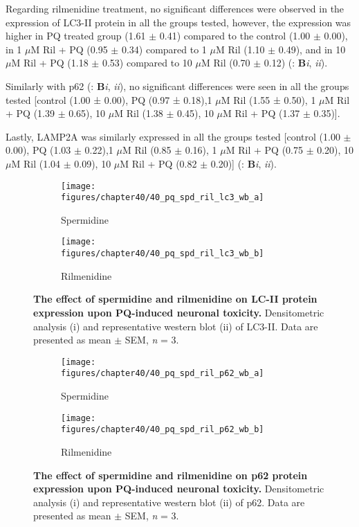 Regarding rilmenidine treatment, no significant differences were observed in the expression of LC3-II protein in all the groups tested, however, the expression was higher in PQ treated group (1.61 $\pm$ 0.41) compared to the control (1.00 $\pm$ 0.00), in 1 $\mu$M Ril + PQ (0.95 $\pm$ 0.34) compared to 1 $\mu$M Ril (1.10 $\pm$ 0.49), and in 10 $\mu$M Ril + PQ (1.18 $\pm$ 0.53) compared to 10 $\mu$M Ril (0.70 $\pm$ 0.12) (: \textbf{B}\textit{i}, \textit{ii}).

Similarly with p62 (: \textbf{B}\textit{i}, \textit{ii}), no significant differences were seen in all the groups tested [control (1.00 ± 0.00), PQ (0.97 ± 0.18),1 $\mu$M Ril (1.55 ± 0.50), 1 $\mu$M Ril + PQ (1.39 $\pm$ 0.65), 10 $\mu$M Ril (1.38 $\pm$ 0.45), 10 $\mu$M Ril + PQ (1.37 $\pm$ 0.35)].

Lastly, LAMP2A was similarly expressed in all the groups tested [control (1.00 $\pm$ 0.00), PQ (1.03 $\pm$ 0.22),1 $\mu$M Ril (0.85 $\pm$ 0.16), 1 $\mu$M Ril + PQ (0.75 $\pm$ 0.20), 10 $\mu$M Ril (1.04 $\pm$ 0.09), 10 $\mu$M Ril + PQ (0.82 $\pm$ 0.20)] (: \textbf{B}\textit{i}, \textit{ii}).

\begin{figure}[!htbp]
  \center
  \begin{subfigure}[b]{0.495\linewidth}
    \texttt{[image: figures/chapter40/40\_pq\_spd\_ril\_lc3\_wb\_a]}
    \caption{Spermidine}
  \end{subfigure}
  \begin{subfigure}[b]{0.495\linewidth}
    \texttt{[image: figures/chapter40/40\_pq\_spd\_ril\_lc3\_wb\_b]}
    \caption{Rilmenidine}
  \end{subfigure}
  \caption[The effect of spermidine and rilmenidine on LC-II protein expression upon PQ-induced neuronal toxicity]{\textbf{The effect of spermidine and rilmenidine on LC-II protein expression upon PQ-induced neuronal toxicity.} Densitometric analysis (i) and representative western blot  (ii) of LC3-II. Data are presented as mean $\pm$ SEM, \textit{n} = 3.}
  \label{fig:40_pq_spd_ril_lc3_wb_a}
\end{figure}
  
\begin{figure}[!htbp]
  \center
  \begin{subfigure}[b]{0.495\linewidth}
    \texttt{[image: figures/chapter40/40\_pq\_spd\_ril\_p62\_wb\_a]}
    \caption{Spermidine}
  \end{subfigure}
  \begin{subfigure}[b]{0.495\linewidth}
    \texttt{[image: figures/chapter40/40\_pq\_spd\_ril\_p62\_wb\_b]}
    \caption{Rilmenidine}
  \end{subfigure}
  \caption[The effect of spermidine and rilmenidine on p62 protein expression upon PQ-induced neuronal toxicity]{\textbf{The effect of spermidine and rilmenidine on p62 protein expression upon PQ-induced neuronal toxicity.} Densitometric analysis (i) and representative western blot  (ii) of p62. Data are presented as mean $\pm$ SEM, \textit{n} = 3.}
  \label{fig:40_pq_spd_ril_p62_wb_a}
\end{figure}
  
